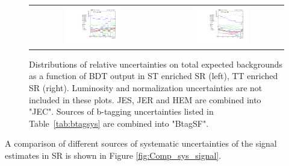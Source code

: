 \begin{figure}[tbh!]
 \begin{center}
 \begin{tabular}{cc}
    \includegraphics[width=0.45\textwidth]{figures/Part3/Systematics/sysBDT_ST_bkg_2017}&
  \includegraphics[width=0.45\textwidth]{figures/Part3/Systematics/sysBDT_TT_bkg_2017} \\
 \end{tabular}
 \caption{Distributions of relative uncertainties on total expected backgrounds as a function of BDT output in ST enriched SR (left), TT enriched SR (right). Luminosity and normalization uncertainties are not included in these plots. JES, JER and HEM are combined into "JEC". Sources of b-tagging uncertainties listed in Table~\ref{tab:btagsys} are combined into "BtagSF".}
 \label{fig:Comp_sys_background}
 \end{center}
\end{figure}

 A comparison of different sources of systematic uncertainties of the signal estimates in SR is shown in Figure \ref{fig:Comp_sys_signal}.

